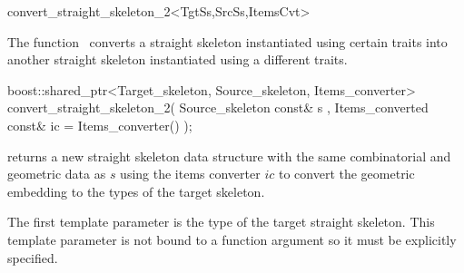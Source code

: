 

\begin{ccRefFunction}{convert_straight_skeleton_2<TgtSs,SrcSs,ItemsCvt>}


\ccDefinition

The function \ccRefName\ converts a straight skeleton instantiated using certain traits into another straight skeleton instantiated using a different traits.


\ccFunction
{boost::shared_ptr<Target_skeleton, Source_skeleton, Items_converter>
 convert_straight_skeleton_2( Source_skeleton const& s
                            , Items_converted const& ic = Items_converter()
                            );
}
{ returns a new straight skeleton data structure with the same combinatorial and geometric data as $s$ using the items converter $ic$ to convert the geometric embedding to the types of the target skeleton.

The first template parameter is the type of the target straight skeleton. This template parameter is not bound to a function argument so it must be explicitly specified.
}

\ccSeeAlso
{}\\
\\
\\

\end{ccRefFunction}


